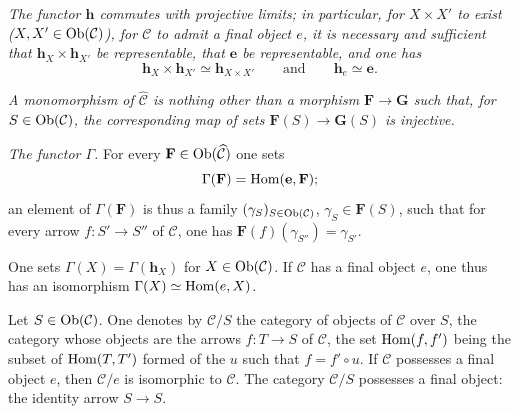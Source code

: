 \emph{The functor \(\mathbf{h}\) commutes with projective limits; in
particular, for \(X\times X'\) to exist
(\(X,X'\in\operatorname{Ob}(\mathcal{C})\)), \resp for \(\mathcal{C}\) to admit a final
object \(e\), it is necessary and sufficient that
\(\mathbf{h}_{X}\times\mathbf{h}_{X'}\) be representable, \resp that
\(\mathbf{e}\) be representable, and one has}
\[
\mathbf{h}_{X}\times\mathbf{h}_{X'}\simeq\mathbf{h}_{X\times X'}
\qquad\text{and}\qquad
\mathbf{h}_{e}\simeq\mathbf{e}.
\]

\emph{A monomorphism of \(\widehat{\mathcal{C}}\) is nothing other than a
morphism \(\mathbf{F}\to\mathbf{G}\) such that, for
\(S\in\operatorname{Ob}(\mathcal{C})\), the corresponding map of sets
\(\mathbf{F}(S)\to\mathbf{G}(S)\) is injective.}%
{\renewcommand{\thefootnote}{(9)}}

\emph{The functor \(\Gamma\).}
For every \(\mathbf{F}\in\operatorname{Ob}(\widehat{\mathcal{C}})\) one sets
\[
\Gamma(\mathbf{F})=\operatorname{Hom}(\mathbf{e},\mathbf{F});
\]
an element of \(\Gamma(\mathbf{F})\) is thus a family
\((\gamma_{S})_{S\in\operatorname{Ob}(\mathcal{C})}\),
\(\gamma_{S}\in\mathbf{F}(S)\), such that for every arrow
\(f\colon S'\to S''\) of \(\mathcal{C}\), one has
\(\mathbf{F}(f)(\gamma_{S''})=\gamma_{S'}\).

One sets \(\Gamma(X)=\Gamma(\mathbf{h}_{X})\) for
\(X\in\operatorname{Ob}(\mathcal{C})\). If \(\mathcal{C}\) has a final object \(e\), one
thus has an isomorphism \(\Gamma(X)\simeq\operatorname{Hom}(e,X)\).

Let \(S\in\operatorname{Ob}(\mathcal{C})\). One denotes by \(\mathcal{C}/S\) the
category of objects of \(\mathcal{C}\) over \(S\), \ie the category whose
objects are the arrows \(f\colon T\to S\) of \(\mathcal{C}\), the set
\(\operatorname{Hom}(f,f')\) being the subset of \(\operatorname{Hom}(T,T')\) formed of the \(u\) such
that \(f=f'\circ u\). If \(\mathcal{C}\) possesses a final object \(e\),
then \(\mathcal{C}/e\) is isomorphic to \(\mathcal{C}\). The category
\(\mathcal{C}/S\) possesses a final object: the identity arrow
\(S\to S\).

